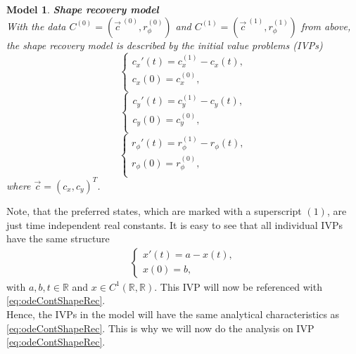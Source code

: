 \documentclass[a4paper,12pt,leqno]{article}
\theoremstyle{plain}
\newtheorem{model}[theorem]{Model}
\theoremstyle{remark}
\newcommand{\R}{\mathbb{R}}
\begin{document}
\begin{model} \textbf{Shape recovery model}\\
	With the data $C^{(0)} = (\vec{c}^{\:(0)}, r_{\phi}^{(0)})$ and $C^{(1)} = (\vec{c}^{\:(1)}, r_{\phi}^{(1)})$ from above, the shape recovery model is described by the initial value problems (IVPs)
	\[ \left\{
	\begin{array}{ll}
		c_x'(t) = c_x^{(1)} - c_x(t),\\
		c_x(0) = c_x^{(0)},\\
	\end{array}
	\right.
	\]
	\[ \left\{
	\begin{array}{ll}
		c_y'(t) = c_y^{(1)} - c_y(t),\\
		c_y(0) = c_y^{(0)},\\
	\end{array}
	\right.
	\]
	\[ \left\{
	\begin{array}{ll}
		r_\phi'(t) = r_\phi^{(1)} - r_\phi(t),\\
		r_\phi(0) = r_\phi^{(0)},\\
	\end{array}
	\right.
	\]
	where $\vec{c} = (c_x, c_y)^T$. 
\end{model} 
Note, that the preferred states, which are marked with a superscript $(1)$, are just time independent real constants. It is easy to see that all individual IVPs have the same structure
\begin{align} \label{eq:odeContShapeRec}
	\begin{cases}
		x'(t) = a - x(t),\\
		x(0) = b,
	\end{cases}
\end{align}
with $a, b, t \in \R$ and $ x \in C^1(\R, \R)$. This IVP will now be referenced with \eqref{eq:odeContShapeRec}. \\
Hence, the IVPs in the model will have the same analytical characteristics as \eqref{eq:odeContShapeRec}. This is why we will now do the analysis on IVP \eqref{eq:odeContShapeRec}. \\
\end{document}
